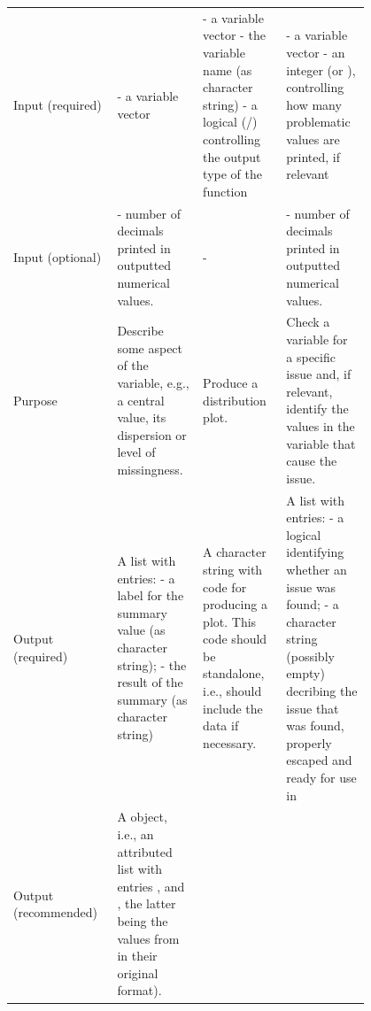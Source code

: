 \documentclass[article,shortnames]{jss}
\begin{document}
\begin{table}[htbp]
\footnotesize
\bgroup
\def\arraystretch{1.8}%
\begin{tabular}{L{0.2\linewidth}L{0.2\linewidth}L{0.2\linewidth}L{0.2\linewidth}}
&  &  &  \\
\hline
\vspace{0pt} Input (required) &  - a variable vector \newline {}  &   - a variable vector \newline {} - the variable name (as character string) \newline {} - a logical (/) controlling the output type of the function &  - a variable vector \newline {} - an integer (or ), controlling how many problematic values are printed, if relevant \newline {}  \\
Input (optional) &   - number of decimals printed in outputted numerical values.  & - &    - number of decimals printed in outputted numerical values.  \\
Purpose & Describe some aspect of the variable, e.g., a central value, its dispersion or level of missingness. & Produce a distribution plot. & Check a variable for a specific issue and, if relevant, identify the values in the variable that cause the issue. \\
Output (required) & A list with entries: \newline {} - a label for the summary value (as character string); \newline {} - the result of the summary (as character string) & A character string with  code for producing a plot. This code should be standalone, i.e., should include the data if necessary. & A list with entries: \newline {} - a logical identifying whether an issue was found; \newline {} - a character string (possibly empty) decribing the issue that was found, properly escaped and ready for use in  \\
Output (recommended) & A  object, i.e., an attributed list with entries ,  and , the latter being the values from  in their original format). & \bgroup

\end{tabular}
\end{table}
\end{document}
